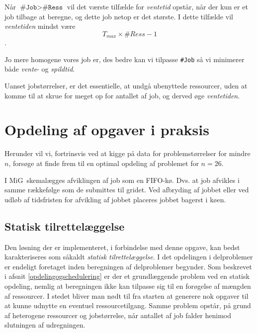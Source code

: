 \documentclass[final,a4paper,11pt]{article}
\newcommand{\mig}{MiG}
\begin{document}
Når $\texttt{\#Job} > \texttt{\#Ress}$ vil det værste tilfælde for \emph{ventetid} opstår, når der kun er et job tilbage at beregne, og dette job netop er det største. I dette tilfælde vil \emph{ventetiden} mindst være 
\[
T_{max} \times \#Ress -1
\]
.



Jo mere homogene vores job er, des bedre kan vi tilpasse \texttt{\#Job} så vi minimerer både \emph{vente}- og \emph{spildtid}. 

Uanset jobstørrelser, er det essentielle, at undgå ubenyttede ressourcer, uden at komme til at skrue for meget op for antallet af job, og derved øge \emph{ventetiden}.




\section{Opdeling af opgaver i praksis}\label{opdelingipraksis}
	Herunder vil vi, fortrinsvis ved at kigge på data for problemstørrelser for mindre $n$, forsøge at finde frem til en optimal opdeling af problemet for $n=26$.

I \mig\ skemalægges afviklingen af job som en FIFO-kø. Dvs. at job afvikles i samme rækkefølge som de submittes til gridet. Ved afbryding af jobbet eller ved udløb af tidsfristen for afvikling af jobbet placeres jobbet bagerst i køen. 


\subsection{Statisk tilrettelæggelse}
Den løsning der er implementeret, i forbindelse med denne opgave, kan bedst karakteriseres som såkaldt \emph{statisk tilrettelæggelse}. I det opdelingen i delproblemer er endeligt foretaget inden beregningen af delproblemer begynder. Som beskrevet i afsnit \ref{opdelingogschedulering} er der et grundlæggende problem ved en statisk opdeling, nemlig at beregningen ikke kan tilpasse sig til en forøgelse af mængden af ressourcer. I stedet bliver man nødt til fra starten at generere nok opgaver til at kunne udnytte en eventuel ressourcetilgang. Samme problem opstår, på grund af heterogene ressourcer og jobstørrelse, når antallet af job falder henimod slutningen af udregningen. 
\end{document}
